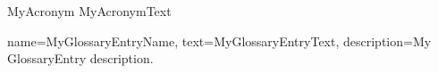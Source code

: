 
{MyAcronym}
{MyAcronymText}


{
    name={MyGlossaryEntryName},
    text={MyGlossaryEntryText},
    description={My GlossaryEntry description.}
}

